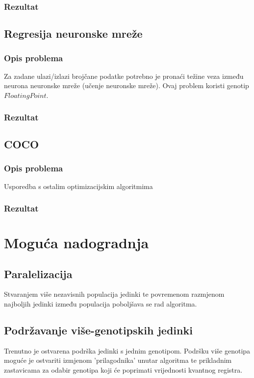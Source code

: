 \documentclass[times, utf8, zavrsni]{fer}
\begin{document}
\subsection{Rezultat}

\section{Regresija neuronske mreže}
\subsection{Opis problema}
Za zadane ulazi/izlazi brojčane podatke potrebno je pronaći težine veza između neurona neuronske mreže (učenje neuronske mreže). Ovaj problem koristi genotip $FloatingPoint$.

\subsection{Rezultat}

\section{COCO}
\subsection{Opis problema}
Usporedba s ostalim optimizacijskim algoritmima

\subsection{Rezultat}


\chapter{Moguća nadogradnja}
\section{Paralelizacija}
Stvaranjem više nezavisnih populacija jedinki te povremenom razmjenom najboljih jedinki između populacija poboljšava se rad algoritma.

\section{Podržavanje više-genotipskih jedinki}
Trenutno je ostvarena podrška jedinki s jednim genotipom. Podršku više genotipa moguće je ostvariti izmjenom 'prilagodnika' unutar algoritma te prikladnim zastavicama za odabir genotipa koji će poprimati vrijednosti kvantnog registra.
\end{document}
